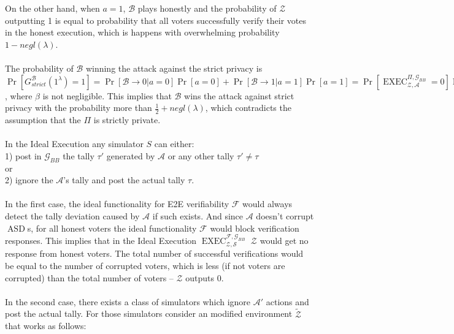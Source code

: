 \documentclass[12pt]{article}
\DeclareMathOperator{\exec}{EXEC}
\DeclareMathOperator{\asd}{ASD}
\begin{document}
On the other hand, when $a=1$, $\mathcal{B}$ plays honestly and the probability of $\mathcal{Z}$ outputting 1 is equal to probability that all voters successfully verify their votes in the honest execution, which is happens with overwhelming probability $1-negl(\lambda)$.\\\\ 
The probability of $\mathcal{B}$  winning the attack against the strict privacy is \\$\Pr[G_{strict}^{\mathcal{B}}(1^{\lambda})=1]= \Pr[\mathcal{B} \rightarrow 0| a=0]\Pr[a=0] + \Pr[\mathcal{B} \rightarrow 1| a=1]\Pr[a=1] =  \Pr[\exec_{\mathcal{Z},\mathcal{A}}^{\Pi, \mathcal{G}_{BB}}=0]\Pr[a=0]  + \Pr[\exec_{\mathcal{Z},honest}^{\Pi, \mathcal{G}_{BB}} =1]\Pr[a=1] \geq \frac{1}{2}\beta+ \frac{1}{2} - negl(\lambda)$ , where $\beta$ is not negligible. This implies that $\mathcal{B}$ wins the attack against strict privacy with the probability more than $\frac{1}{2} + negl(\lambda)$, which contradicts the assumption that the $\Pi$ is strictly private.\\\\
In the Ideal Execution any simulator $S$ can either:\\
1) post in $\mathcal{G}_{BB}$ the tally $\tau'$ generated by $\mathcal{A}$ or any other tally  $\tau' \neq \tau$\\ 
or\\
2) ignore the $\mathcal{A}$'s tally and post the actual tally $\tau$.\\\\
In the first case, the ideal functionality for E2E verifiability  $\mathcal{F}$  would always detect the tally deviation caused by $\mathcal{A}$ if such exists. And since  $\mathcal{A}$ doesn't corrupt $\asd$s, for all honest voters the ideal functionality $\mathcal{F}$ would block verification responses. This implies that in the Ideal Execution $\exec_{\mathcal{Z}, \mathcal{S}}^{\mathcal{F}, \mathcal{G}_{BB}}$ $\mathcal{Z}$ would get no response from honest voters. The total number of successful verifications would be equal to the number of corrupted voters, which is less (if not voters are corrupted) than the total number of voters -- $\mathcal{Z}$ outputs 0.  \\\\
In the second case, there exists a class of simulators which ignore $\mathcal{A'}$ actions and post the actual tally.  For those simulators consider an modified  environment $\tilde{\mathcal{Z}}$ that works as follows:\\\\
\end{document}
